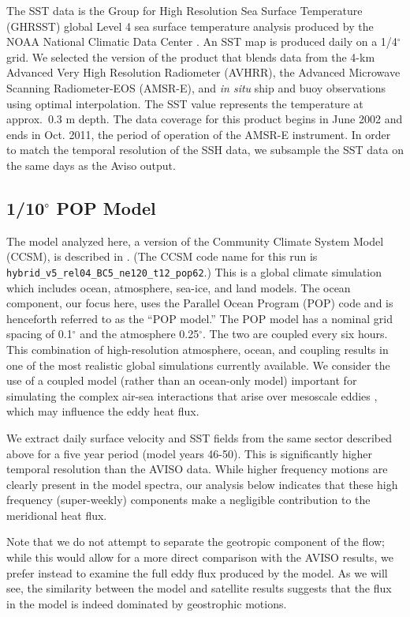 \documentclass[10pt]{article}
\begin{document}
The SST data is the Group for High Resolution Sea Surface Temperature (GHRSST) global Level 4 sea surface temperature analysis produced by the NOAA National Climatic Data Center \citep{ReynoldsEtAl2007}. An SST map is produced daily on a 1/4$^\circ$ grid. We selected the version of the product that blends data from the 4-km Advanced Very High Resolution Radiometer (AVHRR), the Advanced Microwave Scanning Radiometer-EOS (AMSR-E), and {\em in situ} ship and buoy observations using optimal interpolation. The SST value represents the temperature at approx.~0.3 m depth. The data coverage for this product begins in June 2002 and ends in Oct. 2011, the period of operation of the AMSR-E instrument. In order to match the temporal resolution of the SSH data, we subsample the SST data on the same days as the Aviso output.

\subsection{1/10$^\circ$ POP Model}

The model analyzed here, a version of the Community Climate System Model (CCSM), is described in \citet{MccleanEtAl2011}.  (The CCSM code name for this run is {\tt 	hybrid\_v5\_rel04\_BC5\_ne120\_t12\_pop62}.) This is a global climate simulation which includes ocean, atmosphere, sea-ice, and land models. The ocean component, our focus here, uses the Parallel Ocean Program (POP) code and is henceforth referred to as the ``POP model.'' The POP model has a nominal grid spacing of 0.1$^\circ$ and the atmosphere 0.25$^\circ$. The two are coupled every six hours. This combination of high-resolution atmosphere, ocean, and coupling results in one of the most realistic global simulations currently available. We consider the use of a coupled model (rather than an ocean-only model) important for simulating the complex air-sea interactions that arise over mesoscale eddies \citep{SmallEtAl2008,BryanEtAl2010}, which may influence the eddy heat flux.

We extract daily surface velocity and SST fields from the same sector described above for a five year period (model years 46-50). This is significantly higher temporal resolution than the AVISO data. While higher frequency motions are clearly present in the model spectra, our analysis below indicates that these high frequency (super-weekly) components make a negligible contribution to the meridional heat flux.

Note that we do not attempt to separate the geotropic component of the flow; while this would allow for a more direct comparison with the AVISO results, we prefer instead to examine the full eddy flux produced by the model. As we will see, the similarity between the model and satellite results suggests that the flux in the model is indeed dominated by geostrophic motions.
\end{document}

